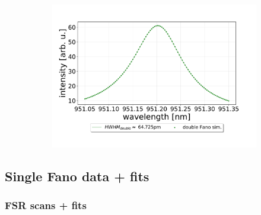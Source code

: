 \begin{figure}[h!]
\begin{subfigure}[b]{0.49\textwidth}
        \includegraphics[width=\textwidth]{figures/double_16percent_loss_30um.pdf}
        \caption{}
        \label{fig:16_percent_loss}
    \end{subfigure}
\end{figure}

\subsection{Single Fano data + fits}

\subsubsection*{FSR scans + fits}

